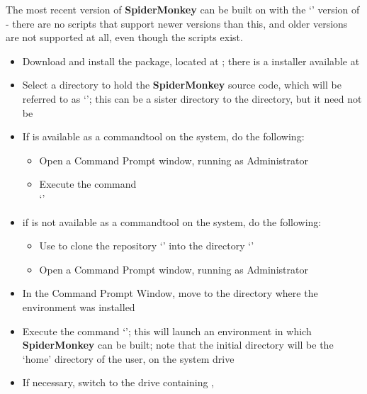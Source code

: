 \tertiaryEnd
{}
The most recent version of \textbf{SpiderMonkey} can be built on \win{} with the
`' version of  - there are
no scripts that support newer versions than this, and older versions are not supported at
all, even though the scripts exist.
\begin{itemize}
\item Download and install the  package, located at
;
there is a \win{} installer available at\\
\item\exSp{}Select a directory to hold the \textbf{SpiderMonkey} source code, which will
be referred to as `'; this can be a sister directory to the
 directory, but it need not be
\item\exSp{}If  is available as a command\longDash{}tool on the system, do the
following:
\begin{itemize}
\item Open a Command Prompt window, running as Administrator
\item\exSp{}Execute the command\\
`'
\end{itemize}
\item\exSp{}if  is not available as a command\longDash{}tool on the system, do
the following:
\begin{itemize}
\item \exSp{}Use  to clone the repository
`' into the directory
`'
\item\exSp{}Open a Command Prompt window, running as Administrator
\end{itemize}
\item\exSp{}In the Command Prompt Window, move to the directory where the
 environment was installed
\item\exSp{}Execute the command `'; this will launch
an environment in which \textbf{SpiderMonkey} can be built; note that the initial
directory will be the `home' directory of the user, on the system drive
\item\exSp{}If necessary, switch to the drive containing ,

\end{itemize}
